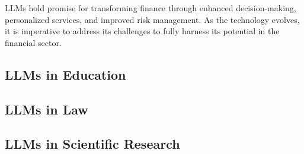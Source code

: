 LLMs hold promise for transforming finance through enhanced decision-making, personalized services, and improved risk management.
As the technology evolves, it is imperative to address its challenges to fully harness its potential in the financial sector.

\subsection{LLMs in Education}
\label{subsec:llms-in-education}

\subsection{LLMs in Law}
\label{subsec:llms-in-law}

\subsection{LLMs in Scientific Research}
\label{subsec:llms-in-scientific-research}
